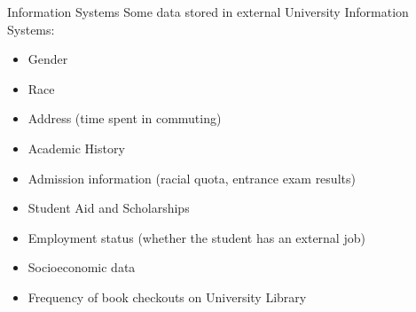 \begin{frame}{Information Systems}
    Some data stored in external University Information Systems:
    \begin{itemize}[<+-|alert@+>]\color{gray}
        \item Gender
        \item Race
        \item Address (time spent in commuting)
        \item Academic History
        \item Admission information (racial quota, entrance exam results)
        \item Student Aid and Scholarships
        \item Employment status (whether the student has an external job)
        \item Socioeconomic data
        \item Frequency of book checkouts on University Library
    \end{itemize}
\end{frame}

